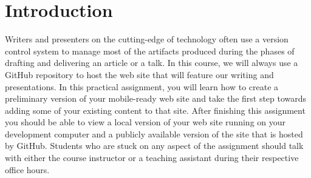 

\usepackage[compact]{titlesec}



\vspace*{-.2in}
\section*{Introduction}

Writers and presenters on the cutting-edge of technology often use a version control system to manage most of the
artifacts produced during the phases of drafting and delivering an article or a talk. In this course, we will always use
a GitHub repository to host the web site that will feature our writing and presentations. In this practical assignment,
you will learn how to create a preliminary version of your mobile-ready web site and take the first step towards adding
some of your existing content to that site. After finishing this assignment you should be able to view a local version
of your web site running on your development computer and a publicly available version of the site that is hosted by
GitHub. Students who are stuck on any aspect of the assignment should talk with either the course instructor or a
teaching assistant during their respective office hours.

